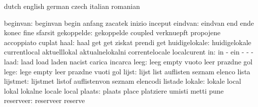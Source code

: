 \startelements             dutch                     english
                           german                    czech
                           italian                   romanian

                 beginvan: beginvan                  begin
                           anfang                    zacatek
                           inizio                    inceput
                  eindvan: eindvan                   end
                           ende                      konec
                           fine                      sfarsit
               gekoppelde: gekoppelde                coupled
                           verknuepft                propojene
                           accoppiato                cuplat
                     haal: haal                      get
                           get                       ziskat
                           prendi                    get
            huidigelokale: huidigelokale             currentlocal
                           aktuelllokal              aktualnelokalni
                           correntelocale            localcurent
                       in: in                        -
                           ein                       -
                           -                         -
                     laad: laad                      load
                           laden                     nacist
                           carica                    incarca
                     leeg: leeg                      empty
                           vuoto                     leer
                           prazdne                   gol
                     lege: lege                      empty
                           leer                      prazdne
                           vuoti                     gol
                    lijst: lijst                     list
                           auflisten                 seznam
                           elenco                    lista
                 lijstmet: lijstmet                  listof
                           auflistenvon              seznam
                           elencodi                  listade
                   lokale: lokale                    local
                           lokal                     lokalne
                           locale                    local
                   plaats: plaats                    place
                           platziere                 umisti
                           metti                     pune
                reserveer: reserveer                 reserve
